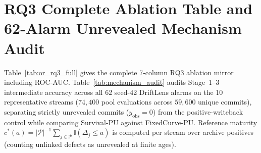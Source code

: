 \documentclass[10pt,a4paper]{article}
\begin{document}
\clearpage
\section{RQ3 Complete Ablation Table and 62-Alarm Unrevealed Mechanism Audit}
\label{sec:or_rq3}

Table~\ref{tab:or_rq3_full} gives the complete 7-column RQ3 ablation mirror including ROC-AUC. Table~\ref{tab:mechanism_audit} audits Stage~1--3 intermediate accuracy across all 62 seed-42 DriftLens alarms on the 10 representative streams ($74{,}400$ pool evaluations across $59{,}600$ unique commits), separating strictly unrevealed commits ($y_{\text{obs}}=0$) from the positive-writeback control while comparing Survival-PU against FixedCurve-PU. Reference maturity $c^*(a) = |\mathcal{P}|^{-1}\sum_{j \in \mathcal{P}} \mathbb{I}(\Delta_j \le a)$ is computed per stream over archive positives (counting unlinked defects as unrevealed at finite ages).
\end{document}
